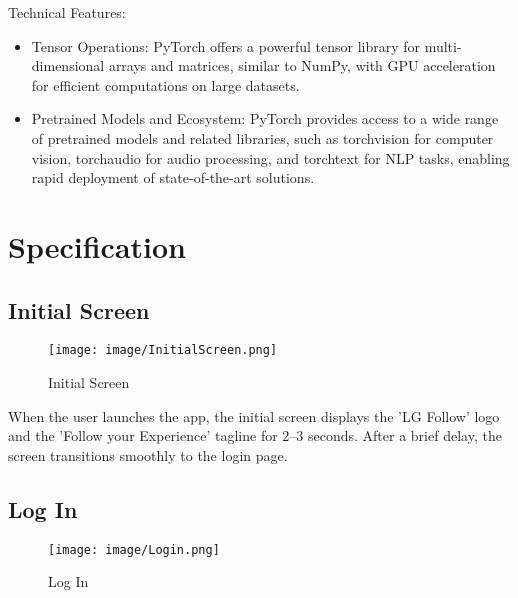 \documentclass[conference]{IEEEtran}
\begin{document}
Technical Features:
\begin{itemize}
    \item Tensor Operations: PyTorch offers a powerful tensor library for multi-dimensional arrays and matrices, similar to NumPy, with GPU acceleration for efficient computations on large datasets.\\
    \item Pretrained Models and Ecosystem: PyTorch provides access to a wide range of pretrained models and related libraries, such as torchvision for computer vision, torchaudio for audio processing, and torchtext for NLP tasks, enabling rapid deployment of state-of-the-art solutions.\\
\end{itemize}

\vspace{3cm}

\section{Specification}

\subsection{Initial Screen}

\begin{figure}[h!]
    \centering
    \texttt{[image: image/InitialScreen.png]}
    \caption{Initial Screen}
    \label{fig:enter-label}
\end{figure}

\noindent When the user launches the app, the initial screen displays the 'LG Follow' logo and the 'Follow your Experience' tagline for 2–3 seconds. After a brief delay, the screen transitions smoothly to the login page.\\

\clearpage

\subsection{Log In}

\begin{figure}[h!]
    \centering
    \texttt{[image: image/Login.png]}
    \caption{Log In}
    \label{fig:enter-label}
\end{figure}
\end{document}

